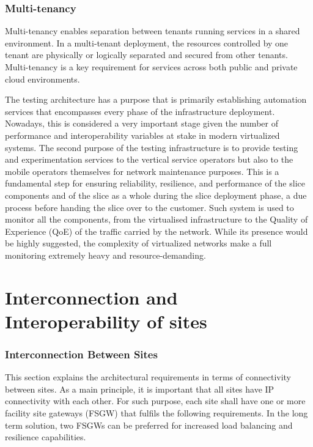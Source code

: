         \subsubsection{Multi-tenancy}
        Multi-tenancy enables separation between tenants running services in a shared environment. In a multi-tenant deployment, the resources controlled by one tenant are physically or logically separated and secured from other tenants. Multi-tenancy is a key requirement for services across both public and private cloud environments.

    The testing architecture has a purpose that is primarily establishing automation services that encompasses every phase of the infrastructure deployment. Nowadays, this is considered a very important stage given the number of performance and interoperability variables at stake in modern virtualized systems. The second purpose of the testing infrastructure is to provide testing and experimentation services to the vertical service operators but also to the mobile operators themselves for network maintenance purposes. This is a fundamental step for ensuring reliability, resilience, and performance of the slice components and of the slice as a whole during the slice deployment phase, a due process before handing the slice over to the customer. Such system is used to monitor all the components, from the virtualised infrastructure to the Quality of Experience (QoE) of the traffic carried by the network. While its presence would be highly suggested, the complexity of virtualized networks make a full monitoring extremely heavy and resource-demanding.

\section{Interconnection and Interoperability of sites}

    \subsubsection{Interconnection Between Sites}
    This section explains the architectural requirements in terms of connectivity between sites. As a main principle, it is important that all sites have IP connectivity with each other. For such purpose, each site shall have one or more facility site gateways (FSGW) that fulfils the following requirements. In the long term solution, two FSGWs can be preferred for increased load balancing and resilience capabilities. 
    

